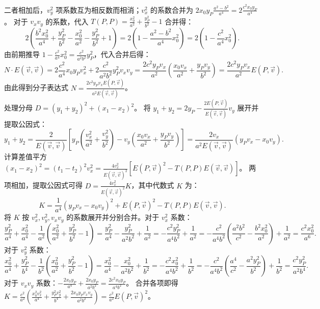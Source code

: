 \begin{solution}
二者相加后，$v_y^2$ 项系数互为相反数而相消；$v_x^2$ 的系数合并为 $2x_0 y_P \frac{a^2 - b^2}{a^4} = 2 \frac{c^2 x_0 y_P}{a^4}$。
对于 $v_x v_y$ 的系数，代入 $T(P, P) = \frac{x_0^2}{a^2} + \frac{y_P^2}{b^2} - 1$ 合并得：
\[
2 \left( \frac{b^2 x_0^2}{a^4} + \frac{y_P^2}{b^2} - \frac{x_0^2}{a^2} - \frac{y_P^2}{b^2} + 1 \right) = 2 \left( 1 - \frac{a^2 - b^2}{a^4} x_0^2 \right) = 2 \left( 1 - \frac{c^2}{a^4} x_0^2 \right).
\]
由前期推导 $1 - \frac{c^2}{a^4} x_0^2 = \frac{c^2}{a^2 b^2} y_P^2$，代入合并后得：
\[
N \cdot E(\vec{v}, \vec{v}) = 2 \frac{c^2}{a^4} x_0 y_P v_x^2 + 2 \frac{c^2}{a^2 b^2} y_P^2 v_x v_y = \frac{2 c^2 y_P v_x}{a^2} \left( \frac{x_0 v_x}{a^2} + \frac{y_P v_y}{b^2} \right) = \frac{2 c^2 y_P v_x}{a^2} E(P, \vec{v}).
\]
由此得到分子表达式 $N = \frac{2 c^2 y_P v_x E(P, \vec{v})}{a^2 E(\vec{v}, \vec{v})}$。\\
处理分母 $D = (y_1 + y_2)^2 + (x_1 - x_2)^2$。
将 $y_1 + y_2 = 2y_P - \frac{2 E(P, \vec{v})}{E(\vec{v}, \vec{v})} v_y$ 展开并提取公因式：
\[
y_1 + y_2 = \frac{2}{E(\vec{v}, \vec{v})} \left[ y_P \left( \frac{v_x^2}{a^2} + \frac{v_y^2}{b^2} \right) - v_y \left( \frac{x_0 v_x}{a^2} + \frac{y_P v_y}{b^2} \right) \right] = \frac{2 v_x}{a^2 E(\vec{v}, \vec{v})} ( y_P v_x - x_0 v_y ).
\]
计算差值平方 $(x_1 - x_2)^2 = (t_1 - t_2)^2 v_x^2 = \frac{4 v_x^2}{E(\vec{v}, \vec{v})^2} [ E(P, \vec{v})^2 - T(P, P) E(\vec{v}, \vec{v}) ]$。
两项相加，提取公因式可得 $D = \frac{4 v_x^2}{E(\vec{v}, \vec{v})^2} K$，其中代数式 $K$ 为：
\[
K = \frac{1}{a^4} (y_P v_x - x_0 v_y)^2 + E(P, \vec{v})^2 - T(P, P) E(\vec{v}, \vec{v}).
\]
将 $K$ 按 $v_x^2, v_y^2, v_x v_y$ 的系数展开并分别合并。对于 $v_x^2$ 系数：
\[
\frac{y_P^2}{a^4} + \frac{x_0^2}{a^4} - \frac{1}{a^2}\left( \frac{x_0^2}{a^2} + \frac{y_P^2}{b^2} - 1 \right) = \frac{y_P^2}{a^4} - \frac{y_P^2}{a^2 b^2} + \frac{1}{a^2} = -\frac{c^2 y_P^2}{a^4 b^2} + \frac{1}{a^2} = -\frac{c^2}{a^4 b^2} \left( \frac{a^2 b^2}{c^2} - \frac{b^2 x_0^2}{a^2} \right) + \frac{1}{a^2} = \frac{c^2 x_0^2}{a^6}.
\]
对于 $v_y^2$ 系数：
\[
\frac{x_0^2}{a^4} + \frac{y_P^2}{b^4} - \frac{1}{b^2}\left( \frac{x_0^2}{a^2} + \frac{y_P^2}{b^2} - 1 \right) = \frac{x_0^2}{a^4} - \frac{x_0^2}{a^2 b^2} + \frac{1}{b^2} = -\frac{c^2 x_0^2}{a^4 b^2} + \frac{1}{b^2} = -\frac{c^2}{a^4 b^2} \left( \frac{a^4}{c^2} - \frac{a^2 y_P^2}{b^2} \right) + \frac{1}{b^2} = \frac{c^2 y_P^2}{a^2 b^4}.
\]
对于 $v_x v_y$ 系数：$-\frac{2x_0 y_P}{a^4} + \frac{2x_0 y_P}{a^2 b^2} = \frac{2c^2 x_0 y_P}{a^4 b^2}$。
合并各项即得 $K = \frac{c^2}{a^2} \left( \frac{x_0^2 v_x^2}{a^4} + \frac{y_P^2 v_y^2}{b^4} + \frac{2 x_0 y_P v_x v_y}{a^2 b^2} \right) = \frac{c^2}{a^2} E(P, \vec{v})^2$。

\end{solution}
